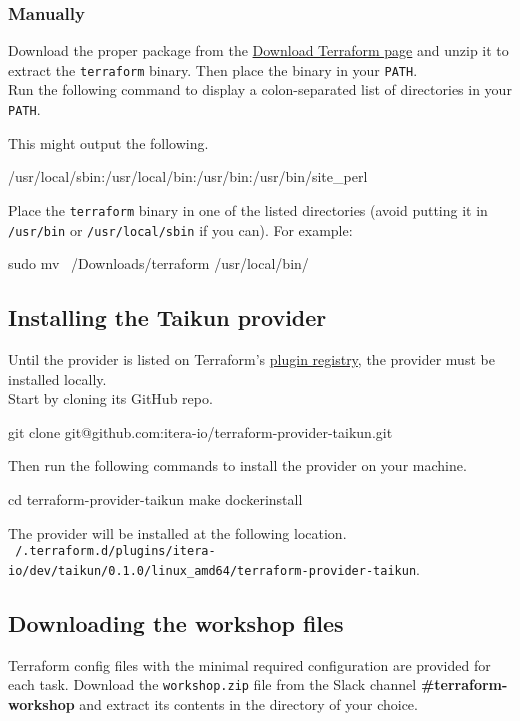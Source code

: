 \subsubsection{Manually}
Download the proper package from the \href{https://www.terraform.io/downloads.html}{Download Terraform page}
and unzip it to extract the \texttt{terraform} binary.
Then place the binary in your \texttt{PATH}.\\

Run the following command to display a colon-separated list of directories in your \texttt{PATH}.
This might output the following.
\begin{raw}
/usr/local/sbin:/usr/local/bin:/usr/bin:/usr/bin/site_perl
\end{raw}
Place the \texttt{terraform} binary in one of the listed directories (avoid putting it in \texttt{/usr/bin} or \texttt{/usr/local/sbin} if you can).
For example:
\begin{shell}
sudo mv ~/Downloads/terraform /usr/local/bin/
\end{shell}

\subsection{Installing the Taikun provider}
Until the provider is listed on Terraform's \href{https://registry.terraform.io/browse/providers}{plugin registry},
the provider must be installed locally.\\

Start by cloning its GitHub repo.
\begin{shell}
git clone git@github.com:itera-io/terraform-provider-taikun.git
\end{shell}
Then run the following commands to install the provider on your machine.
\begin{shell}
cd terraform-provider-taikun
make dockerinstall
\end{shell}
The provider will be installed at the following location.\\
\texttt{~/.terraform.d/plugins/itera-io/dev/taikun/0.1.0/linux\_amd64/terraform-provider-taikun}.

\subsection{Downloading the workshop files}
Terraform config files with the minimal required configuration are provided for each task.
Download the \texttt{workshop.zip} file from the Slack channel \textbf{\#terraform-workshop}
and extract its contents in the directory of your choice.\\
